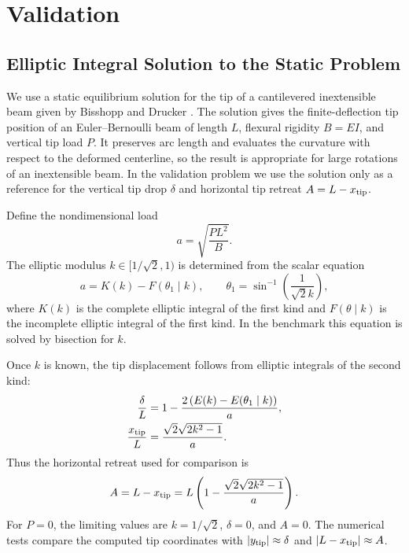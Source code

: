 \section{Validation}

\subsection{Elliptic Integral Solution to the Static Problem}

We use a static equilibrium solution for the tip of a cantilevered inextensible
beam given by Bisshopp and Drucker \cite{bisshopp_large_1945}. The solution
gives the finite-deflection tip position of an Euler--Bernoulli beam of length
\(L\), flexural rigidity \(B=EI\), and vertical tip load \(P\). It preserves
arc length and evaluates the curvature with respect to the deformed centerline,
so the result is appropriate for large rotations of an inextensible beam. In
the validation problem we use the solution only as a reference for the vertical
tip drop \(\delta\) and horizontal tip retreat \(A=L-x_{\rm tip}\).

Define the nondimensional load
\begin{equation*}
    a = \sqrt{\frac{P L^2}{B}} .
\end{equation*}
The elliptic modulus \(k\in[1/\sqrt{2},1)\) is determined from the scalar
equation
\begin{equation*}
    a = K(k) - F(\theta_1 \mid k),
    \qquad
    \theta_1 =
    \sin^{-1}\left(\frac{1}{\sqrt{2}k}\right),
\end{equation*}
where \(K(k)\) is the complete elliptic integral of the first kind and
\(F(\theta\mid k)\) is the incomplete elliptic integral of the first kind. In
the benchmark this equation is solved by bisection for \(k\).

Once \(k\) is known, the tip displacement follows from elliptic integrals of
the second kind:
\begin{align*}
    \frac{\delta}{L}
     & = 1 -
    \frac{2\left(E(k)-E(\theta_1\mid k)\right)}{a}, \\
    \frac{x_{\rm tip}}{L}
     & = \frac{\sqrt{2}\sqrt{2k^2-1}}{a}.
\end{align*}
Thus the horizontal retreat used for comparison is
\begin{equation*}
    A
    = L - x_{\rm tip}
    = L\left(1-\frac{\sqrt{2}\sqrt{2k^2-1}}{a}\right).
\end{equation*}
For \(P=0\), the limiting values are \(k=1/\sqrt{2}\), \(\delta=0\), and
\(A=0\). The numerical tests compare the computed tip coordinates with
\(\left| y_{\rm tip} \right|\approx\delta\) and
\(\left| L-x_{\rm tip} \right|\approx A\).

